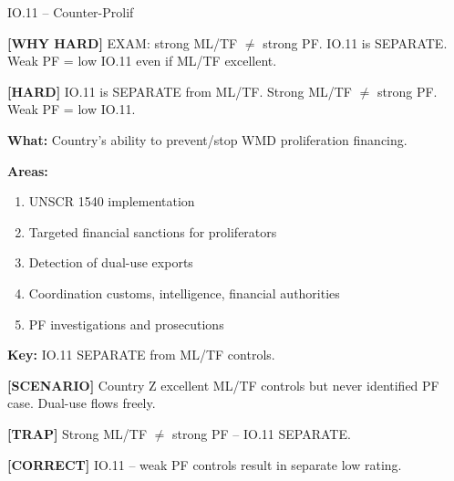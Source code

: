 \documentclass[6pt,aspectratio=169,fontsize=5pt]{beamer}
\renewcommand{\tiny}{\fontsize{3.5pt}{4.5pt}\selectfont}
\renewcommand{\normalsize}{\fontsize{7.5pt}{8.5pt}\selectfont}
\newcommand{\trap}[1]{%
	\begin{block}{\textcolor{redtrap}{\textbf{[TRAP]}}}
		\textcolor{redtrap}{\tiny #1}
	\end{block}
}
\newcommand{\scenario}[1]{%
	\begin{block}{\textbf{[SCENARIO]}}
		\tiny #1
	\end{block}
}
\newcommand{\correct}[1]{%
	\begin{block}{\textcolor{greencorrect}{\textbf{[CORRECT]}}}
		\textcolor{greencorrect}{\tiny #1}
	\end{block}
}
\newcommand{\hard}[1]{%
	\begin{block}{\textcolor{hardcolor}{\textbf{[HARD]}}}
		\textcolor{hardcolor}{\tiny #1}
	\end{block}
}
\newcommand{\hardexplain}[1]{%
	\begin{block}{\textcolor{orangehard}{\textbf{[WHY HARD]}}}
		\textcolor{orangehard}{\tiny #1}
	\end{block}
}
\begin{document}
	\begin{frame}{\normalsize IO.11 -- Counter-Prolif}
		
		\hardexplain{EXAM: strong ML/TF $\neq$ strong PF. IO.11 is SEPARATE. Weak PF = low IO.11 even if ML/TF excellent.}
		
		\hard{IO.11 is SEPARATE from ML/TF. Strong ML/TF $\neq$ strong PF. Weak PF = low IO.11.}
		
		\textbf{What:} Country's ability to prevent/stop WMD proliferation financing.
		
		\textbf{Areas:}
		\begin{enumerate}
			\item UNSCR 1540 implementation
			\item Targeted financial sanctions for proliferators
			\item Detection of dual-use exports
			\item Coordination customs, intelligence, financial authorities
			\item PF investigations and prosecutions
		\end{enumerate}
		
		\textbf{Key:} IO.11 SEPARATE from ML/TF controls.
		
		\scenario{Country Z excellent ML/TF controls but never identified PF case. Dual-use flows freely.}
		
		\trap{Strong ML/TF $\neq$ strong PF -- IO.11 SEPARATE.}
		
		\correct{IO.11 -- weak PF controls result in separate low rating.}
	\end{frame}
	
\end{document}

